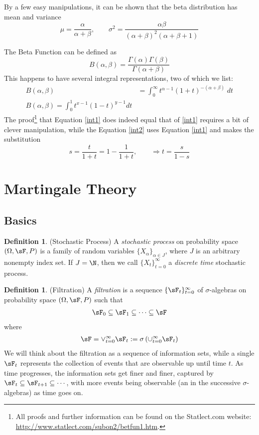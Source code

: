 \documentclass[12pt]{article}
\theoremstyle{plain}
\theoremstyle{definition}
\newtheorem{defn}[thm]{Definition}
\theoremstyle{remark}
\newcommand{\tinfz}{_{t=0}^\infty}
\begin{document}
By a few easy manipulations, it can be shown that the beta distribution
has mean and variance
\begin{equation}
   \label{beta}
    \mu = \frac{\alpha}{\alpha+\beta}, \qquad \sigma^2 =
      \frac{\alpha\beta}{(\alpha+\beta)^2 (\alpha+\beta+1)}
\end{equation}

The Beta Function can be defined as
\[ B(\alpha, \beta) = \frac{\Gamma(\alpha) \Gamma(\beta)}{\Gamma(\alpha
   + \beta)} \]
This happens to have several integral representations, two of which
we list:
\begin{align}
   B(\alpha, \beta) &= \int^{\infty}_0 t^{\alpha-1} (1+t)^{-(\alpha+
   \beta)} \; dt \label{int1} \\
   B(\alpha, \beta) = \int^1_0 t^{x-1} (1-t)^{y-1} dt \label{int2}
\end{align}
The proof\footnote{All proofs and further information can be found
   on the Statlect.com website:
   \url{http://www.statlect.com/subon2/betfun1.htm}. }
that Equation \ref{int1} does indeed equal that of \ref{int1}
requires a bit of clever manipulation, while the Equation \ref{int2} uses
Equation \ref{int1} and makes the substitution
   \[ s = \frac{t}{1+t} = 1-\frac{1}{1+t}, \qquad \Rightarrow
      t = \frac{s}{1-s} \]



\clearpage
\section{Martingale Theory}

\subsection{Basics}
\begin{defn}(Stochastic Process)
A \emph{stochastic process} on probability space $(\Omega,\sF,P)$ is a
family of random variables $\{X_\alpha\}_{\alpha\in J}$, where $J$ is an
arbitrary nonempty index set.
If $J=\N$, then we call $\{X_t\}\tinfz$ a \emph{discrete time}
stochastic process.
\end{defn}

\begin{defn}(Filtration)
A \emph{filtration} is a sequence $\{\sF_t\}\tinfz$ of $\sigma$-algebras
on probability space $(\Omega,\sF,P)$ such that
\begin{align*}
  \sF_0 \subseteq \sF_1 \subseteq \cdots \subseteq\sF
\end{align*}
where
\begin{align*}
  \sF = \vee\tinfz \sF_t := \sigma\left(\cup\tinfz \sF_t\right)
\end{align*}
We will think about the filtration as a sequence of information sets,
while a single $\sF_t$ represents the collection of events that are
observable up until time $t$. As time progresses, the information sets
get finer and finer, captured by
$\sF_t\subseteq \sF_{t+1}\subseteq\cdots$, with more events being
observable (an in the successive $\sigma$-algebras) as time goes on.
\end{defn}
\end{document}
